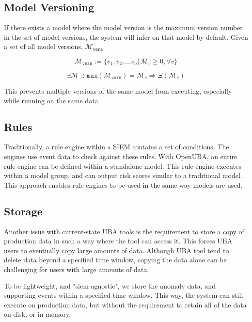 \documentclass[10pt, titlepage, twocolumn]{article}
\begin{document}
\subsection{Model Versioning}
If there exists a model where the model version is the maximum version number in the set of model versions, the system will infer on that model by default. Given a set of all model versions, \(\boldsymbol {\mathcal{M}}_{\texttt{vers}}\)

\begin{equation}
\boldsymbol {\mathcal{M}}_{\texttt{vers}} := \{v_1, v_2, \ldots v_n \vert \, \boldsymbol{\mathcal{M}}_v \geq 0, \forall v \}
\end{equation}

\begin{equation}
\exists \boldsymbol {\mathcal{M}} \ni \texttt{max}( \boldsymbol {\mathcal{M}}_{\texttt{vers}} ) = \boldsymbol {\mathcal{M}}_v  \Rightarrow \Xi(\boldsymbol {\mathcal{M}}_v)
\end{equation}


This prevents multiple versions of the same model from executing, especially while running on the same data.


\subsection{Rules}
Traditionally, a rule engine within a SIEM contains a set of conditions. The engines use event data to check against these rules. With OpenUBA, an entire rule engine can be defined within a standalone model. This rule engine executes within a model group, and can output risk scores similar to a traditional model. This approach enables rule engines to be used in the same way models are used. 



\subsection{Storage}
Another issue with current-state UBA tools is the requirement to store a copy of production data in such a way where the tool can access it. This forces UBA users to eventually copy large amounts of data. Although UBA tool tend to delete data beyond a specified time window, copying the data alone can be challenging for users with large amounts of data. 

To be lightweight, and "siem-agnostic", we store the anomaly data, and supporting events within a specified time window. This way, the system can still execute on production data, but without the requirement to retain all of the data on disk, or in memory.
\end{document}
